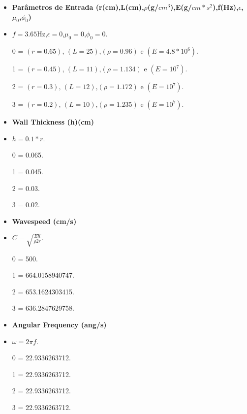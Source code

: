 \documentclass[10pt]{beamer}
\theoremstyle{remark}
\theoremstyle{definition}
\begin{document}
\begin{frame}[allowframebreaks]
		\framebreak
		
		\begin{itemize}
			\item \textbf{Parâmetros de Entrada (r(cm),L(cm),$\rho$(g/$cm^3$),E(g/$cm*s^2$),f(Hz),$\epsilon$,$\mu_0$,$\phi_0$)}
			\item $ f =3.65$Hz,$\epsilon = 0$,$\mu_0 = 0$,$\phi_0 = 0$.
			\item [0] = $(r = 0.65)$, $(L = 25)$,$(\rho = 0.96)$ e $(E = 4.8 * 10^6)$.
			\item [1] = $(r = 0.45)$, $(L = 11)$,$(\rho = 1.134)$ e $(E = 10^7)$.
			\item [2] = $(r = 0.3)$, $(L = 12)$,$(\rho = 1.172)$ e $(E = 10^7)$.
			\item [3] = $(r = 0.2)$, $(L = 10)$,$(\rho = 1.235)$ e $(E = 10^7)$.
			
		\end{itemize}
		
		\framebreak

		\begin{itemize}
			\item \textbf{Wall Thickness (h)(cm)}
			\item $ h = 0.1 * r $.
			\item [0] = 0.065.
			\item [1] = 0.045.
			\item [2] = 0.03.
			\item [3] = 0.02.
			
		\end{itemize}
		
		\framebreak
		
		\begin{itemize}
			\item \textbf{Wavespeed (cm/s)}
			\item $ C = \sqrt{\frac{Eh}{\rho 2 r}}$.
			\item [0] = 500.
			\item [1] = 664.0158940747.
			\item [2] = 653.1624303415.
			\item [3] = 636.2847629758.
		
		\end{itemize}
		
		\framebreak
		
		\begin{itemize}
		\item \textbf{Angular Frequency (ang/s)}
		\item $ \omega = 2 \pi f$.
		\item [0] = 22.9336263712.
		\item [1] = 22.9336263712.
		\item [2] = 22.9336263712.
		\item [3] = 22.9336263712.
		

\end{itemize}
\end{frame}
\end{document}
